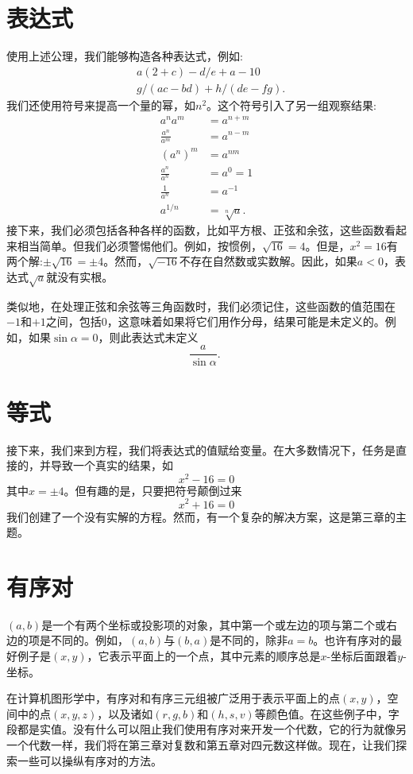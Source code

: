 \section{表达式}
使用上述公理，我们能够构造各种表达式，例如:
$$
\begin{aligned}
& a(2+c)-d / e+a-10 \\
& g /(a c-b d)+h /(d e-f g) .
\end{aligned}
$$
我们还使用符号来提高一个量的幂，如$n^{2}$。这个符号引入了另一组观察结果:
$$
\begin{aligned}
a^{n} a^{m} & =a^{n+m} \\
\frac{a^{n}}{a^{m}} & =a^{n-m} \\
\left(a^{n}\right)^{m} & =a^{n m} \\
\frac{a^{n}}{a^{n}} & =a^{0}=1 \\
\frac{1}{a^{n}} & =a^{-1} \\
a^{1 / n} & =\sqrt[n]{a} .
\end{aligned}
$$
接下来，我们必须包括各种各样的函数，比如平方根、正弦和余弦，这些函数看起来相当简单。但我们必须警惕他们。例如，按惯例，$\sqrt{16}=4$。但是，$x^{2}=16$有两个解:$\pm \sqrt{16}=\pm 4$。然而，$\sqrt{-16}$不存在自然数或实数解。因此，如果$a<0$，表达式$\sqrt{a}$就没有实根。

类似地，在处理正弦和余弦等三角函数时，我们必须记住，这些函数的值范围在$-1$和$+1$之间，包括0，这意味着如果将它们用作分母，结果可能是未定义的。例如，如果$\sin \alpha=0$，则此表达式未定义
$$
\frac{a}{\sin \alpha} \text {. }
$$

\section{等式}
接下来，我们来到方程，我们将表达式的值赋给变量。在大多数情况下，任务是直接的，并导致一个真实的结果，如
$$
x^{2}-16=0
$$
其中$x=\pm 4$。但有趣的是，只要把符号颠倒过来
$$
x^{2}+16=0
$$
我们创建了一个没有实解的方程。然而，有一个复杂的解决方案，这是第三章的主题。

\section{有序对}
$(a, b)$是一个有两个坐标或投影项的对象，其中第一个或左边的项与第二个或右边的项是不同的。例如，$(a, b)$与$(b, a)$是不同的，除非$a=b$。也许有序对的最好例子是$(x, y)$，它表示平面上的一个点，其中元素的顺序总是$x$-坐标后面跟着$y$-坐标。

在计算机图形学中，有序对和有序三元组被广泛用于表示平面上的点$(x, y)$，空间中的点$(x, y, z)$，以及诸如$(r, g, b)$和$(h, s, v)$等颜色值。在这些例子中，字段都是实值。没有什么可以阻止我们使用有序对来开发一个代数，它的行为就像另一个代数一样，我们将在第三章对复数和第五章对四元数这样做。现在，让我们探索一些可以操纵有序对的方法。

